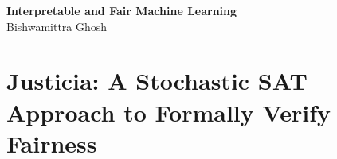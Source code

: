 \documentclass[12pt]{report}
\begin{document}
	\begin{center}
		\Large \textbf{Interpretable and Fair Machine Learning} \\
		\vspace{1em}
		\large Bishwamittra Ghosh
	\end{center}
	
	
	
	
	
			\chapter{Justicia: A Stochastic SAT Approach to Formally Verify Fairness}
				
				
				
				
				
				
				
				
\end{document}
